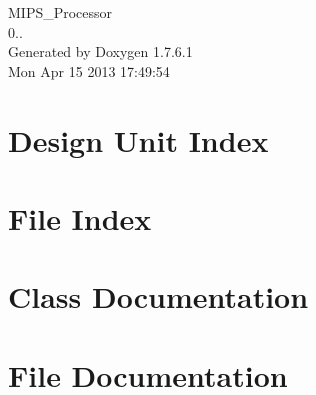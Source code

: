 \documentclass[a4paper]{book}
\begin{document}
\hypersetup{pageanchor=false,citecolor=blue}
\begin{titlepage}
\vspace*{7cm}
\begin{center}
{\Large \-M\-I\-P\-S\-\_\-\-Processor \\[1ex]\large 0.. }\\
\vspace*{1cm}
{\large \-Generated by Doxygen 1.7.6.1}\\
\vspace*{0.5cm}
{\small Mon Apr 15 2013 17:49:54}\\
\end{center}
\end{titlepage}
\clearemptydoublepage
{}
\tableofcontents
\clearemptydoublepage
{}
\hypersetup{pageanchor=true,citecolor=blue}
\chapter{\-Design \-Unit \-Index}

\chapter{\-File \-Index}

\chapter{\-Class \-Documentation}














































\chapter{\-File \-Documentation}


\printindex
\end{document}
